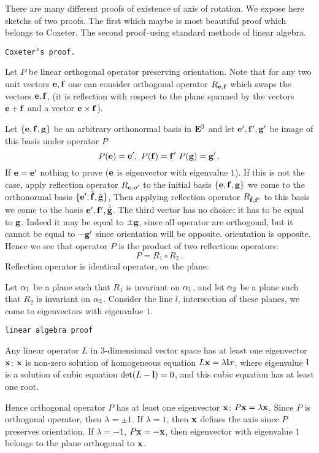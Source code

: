 \documentclass[12pt]{article}
\numberwithin{equation}{section}
\begin{document}
{\footnotesize   There are many different proofs of existence of axis
of rotation.
 We expose here sketchs of two proofs.
   The first which maybe is  most beautiful proof 
which belongs to Coxeter.  The second proof--using standard methods of
linear algebra.

  {\tt Coxeter's proof.}

 Let $P$ be linear orthogonal operator 
preserving orientation.
Note that for any two
 unit vectors ${\bf e},{\bf f}$ one can consider
orthogonal operator $R_{{\bf e},{\bf f}}$ which 
swaps the vectors ${\bf e},{\bf f}$, (it is reflection with respect to
the plane spanned by the
vectors ${\bf e}+{\bf f}$ and a vector ${\bf e}\times {\bf f}$).


Let $\{{\bf e},{\bf f},{\bf g}\}$ be an arbitrary  orthonormal basis in ${\bf E}^3$ and
let ${{\bf e}',{\bf f}',{\bf g}'}$ be image of this basis under operator $P$
               $$
    P({\bf e})={\bf e}',\,\,P({\bf f})={\bf f}'\,\,P({\bf g})={\bf g}'\,.
                $$
If ${\bf e}={\bf e}'$ nothing to prove (${\bf e}$ is eigenvector with eigenvalue $1$).
If this is not the case, apply reflection operator $R_{{\bf e},{\bf e}'}$ to the
initial basis $\{{\bf e},{\bf f},{\bf g}\}$ we come to the orthonormal basis
$\{{\bf e}',\tilde {{\bf f}},\tilde {{\bf g}}\}$, Then applying reflection operator
$R_{\tilde {{\bf f}},{\bf f}'}$ to this basis we come to the basis
${{\bf e}',{\bf f}',\tilde {\tilde {{\bf g}}}}$. The third vector has no choice: it 
has to be equal to ${\bf g}$. Indeed it 
may be equal to $\pm {\bf g}$, since all operator are orthogonal,
but it cannot be equal to $-{\bf g}'$ since orientation will be opposite.
orientation is opposite. Hence we see that
operator $P$ is the product of two reflections operators:
                  $$
            P=R_1\circ R_2\,.
                  $$
Reflection operator is identical operator, on the plane.

  Let $\alpha_1$ be a plane such that $R_1$ is invariant on $\alpha_1$,
  and let $\alpha_2$ be a plane such that $R_2$ is invariant on $\alpha_2$.
Consider the line $l$, intersection of these planes, we come to
eigenvectors with eigenvalue $1$.\finish

\m

{\tt linear algebra proof}


Any linear operator $L$ in $3$-dimensional vector
space has at least one eigenvector ${\bf x}$:
${\bf x}$ is non-zero solution of homogeneous equation
  $L{\bf x}=\lambda {\bf l} x$, where eigenvalue ${\bf l}$ is a solution of 
cubic equation
  $\det (L-{\bf l})=0$, and this cubic equation has at least one root.

  Hence orthogonal operator $P$ has at least 
one eigenvector ${\bf x}$: $P{\bf x}=\lambda {\bf x}$,
 Since $P$ is orthogonal operator, then $\lambda=\pm1$.  
If $\lambda=1$,
then ${\bf x}$ defines the axis since $P$ preserves orientation.
 If $\lambda=-1$, $P{\bf x}=-{\bf x}$, then
eigenvector with eigenvalue $1$ belongs to the plane orthogonal 
to ${\bf x}$.\finish

   }
\end{document}
